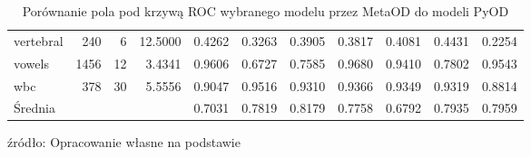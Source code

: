 \begin{sidewaystable}
\begin{tabular}{lrrrrrrrrrr}
 vertebral &       240 &             6 &       12.5000 & 0.4262 & 0.3263 &   0.3905 & 0.3817 & 0.4081 & 0.4431 &  0.2254 \\
    vowels &      1456 &            12 &        3.4341 & 0.9606 & 0.6727 &   0.7585 & 0.9680 & 0.9410 & 0.7802 &  0.9543 \\
       wbc &       378 &            30 &        5.5556 & 0.9047 & 0.9516 &   0.9310 & 0.9366 & 0.9349 & 0.9319 &  0.8814 \\
\bottomrule
 Średnia & & & &
0.7031&
0.7819&
0.8179&
0.7758&
0.6792&
0.7935&
0.7959&
\end{tabular}
\caption{Porównanie pola pod krzywą ROC wybranego modelu przez MetaOD do modeli PyOD}
\footnotesize{źródło: Opracowanie własne na podstawie \cite{zhao2019pyod}}
    \label{tab:roc_od}
\end{sidewaystable}

